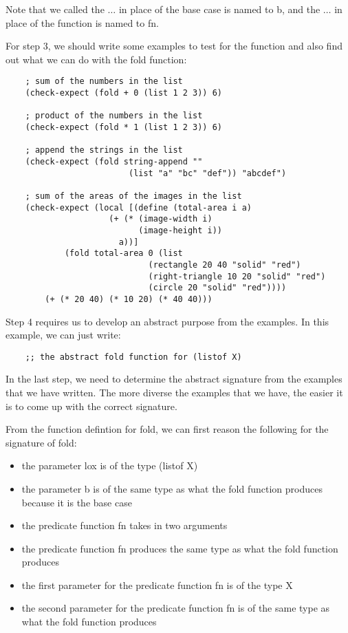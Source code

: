 \documentclass[11pt,a4paper]{report}
\begin{document}
	Note that we called the $\ldots$ in place of the base case is named to b, and the $\ldots$ in place of the
	function is named to fn.
	
	For step 3, we should write some examples to test for the function and also find out what we can
	do with the fold function:
	
	\begin{verbatim}
	; sum of the numbers in the list
	(check-expect (fold + 0 (list 1 2 3)) 6)
	
	; product of the numbers in the list
	(check-expect (fold * 1 (list 1 2 3)) 6)
	
	; append the strings in the list
	(check-expect (fold string-append "" 
	                     (list "a" "bc" "def")) "abcdef")
	
	; sum of the areas of the images in the list
	(check-expect (local [(define (total-area i a)
		             (+ (* (image-width i)
		                   (image-height i))
		               a))]
			(fold total-area 0 (list 
		                     (rectangle 20 40 "solid" "red")
		                     (right-triangle 10 20 "solid" "red")
		                     (circle 20 "solid" "red"))))
		(+ (* 20 40) (* 10 20) (* 40 40)))
	\end{verbatim}
	
	Step 4 requires us to develop an abstract purpose from the examples. In this example, we can just
	write:
	
	\begin{verbatim}
	;; the abstract fold function for (listof X)
	\end{verbatim}
	
	In the last step, we need to determine the abstract signature from the examples that we have
	written. The more diverse the examples that we have, the easier it is to come up with the correct
	signature.
	
	From the function defintion for fold, we can first reason the following for the signature of fold:
	\begin{itemize}
		\item the parameter lox is of the type (listof X)
		\item the parameter b is of the same type as what the fold function produces because it is the base
		case
		\item the predicate function fn takes in two arguments
		\item the predicate function fn produces the same type as what the fold function produces
		\item the first parameter for the predicate function fn is of the type X
		\item the second parameter for the predicate function fn is of the same type as what the fold
		function produces
	\end{itemize}
\end{document}
